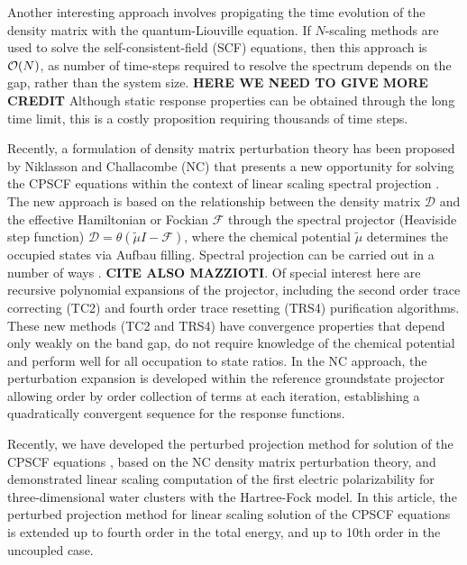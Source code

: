 \documentclass[prl,aps,letterpaper,twocolumn,showpacs,twocolumngrid,superbib]{revtex4}
\begin{document}
Another interesting approach involves propigating the time evolution of 
the density matrix with the quantum-Liouville equation.  If $N$-scaling
methods are used to solve the self-consistent-field (SCF) equations, then
this approach is ${\cal O}(N)$, as number of time-steps required to resolve
the spectrum depends on the gap, rather than the system size.   
{\bf HERE WE NEED TO GIVE MORE CREDIT 
}
Although static response properties can be obtained through the 
long time limit, this is a costly proposition requiring thousands of 
time steps.

\newpage

Recently, a formulation of density matrix perturbation theory has been proposed 
by Niklasson and Challacombe (NC) \cite{ANiklasson04} that presents a new opportunity for 
solving the CPSCF equations within the context of linear scaling spectral projection 
\cite{ANiklasson02A,ANiklasson03}.  The new approach is based on the relationship between 
the density matrix $\mathcal{D}$ and the effective Hamiltonian or Fockian $\mathcal{F}$ 
through the spectral projector (Heaviside step function) $\mathcal{D}=\theta(\tilde{\mu}I-\mathcal{F})$, 
where the chemical potential $\tilde{\mu}$ determines the occupied states via Aufbau filling.   
Spectral projection can be carried out in a number of ways 
\cite{ANiklasson02A,ANiklasson03,RMcWeeny60,WClinton69,APalser98,GBeylkin99,KNemeth00,AHolas01}.
{\bf CITE ALSO MAZZIOTI}.  Of special interest here are recursive polynomial expansions of 
the projector, including the second order trace correcting (TC2) \cite{ANiklasson02A} and 
fourth order trace resetting (TRS4) \cite{ANiklasson03} purification algorithms.  
These new methods (TC2 and TRS4) have convergence properties that depend only weakly on the 
band gap, do not require knowledge of the chemical potential and perform well for all occupation 
to state ratios. In the NC approach, the perturbation expansion is developed within the reference 
groundstate projector allowing order by order collection of terms at each iteration, establishing 
a quadratically convergent sequence for the response functions.  

Recently, we have developed the perturbed projection method for 
solution of the CPSCF equations \cite{Weber04}, based on the NC density matrix perturbation theory,
and demonstrated linear scaling computation of the first electric polarizability for 
three-dimensional water clusters with the Hartree-Fock model. In this article, the 
perturbed projection method for linear scaling solution of the CPSCF equations
is extended up to fourth order in the total energy, and up to 10th order in the uncoupled case.
\end{document}
